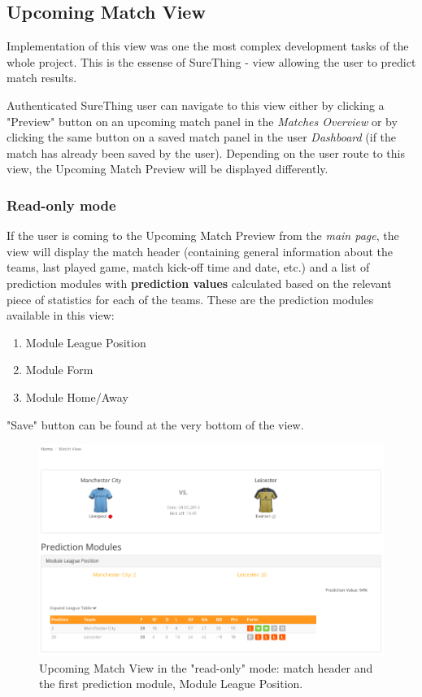 \subsection{Upcoming Match View}
\label{subsec:implementupcomingmatchview}
Implementation of this view was one the most complex development tasks of the whole project. This is the essense of SureThing - view allowing the user to predict match results. 

Authenticated SureThing user can navigate to this view either by clicking a "Preview" button on an upcoming match panel in the \emph{Matches Overview} or by clicking the same button on a saved match panel in the user \emph{Dashboard} (if the match has already been saved by the user). Depending on the user route to this view, the Upcoming Match Preview will be displayed differently.

\subsubsection*{Read-only mode}
If the user is coming to the Upcoming Match Preview from the \emph{main page}, the view will display the match header (containing general information about the teams, last played game, match kick-off time and date, etc.) and a list of prediction modules with \textbf{prediction values} calculated based on the relevant piece of statistics for each of the teams. These are the prediction modules available in this view: 

\begin{enumerate}
	\item Module League Position
	\item Module Form
	\item Module Home/Away
\end{enumerate}

"Save" button can be found at the very bottom of the view.

\begin{figure}[H]
	\begin{center}
		\includegraphics[width=.90\linewidth,natwidth=610,natheight=642]{impl/images/upcomingMatchView}
		\caption{Upcoming Match View in the "read-only" mode: match header and the first prediction module, Module League Position.} 
		\label{fig:using:upcominmatchview}
	\end{center}
\end{figure}

